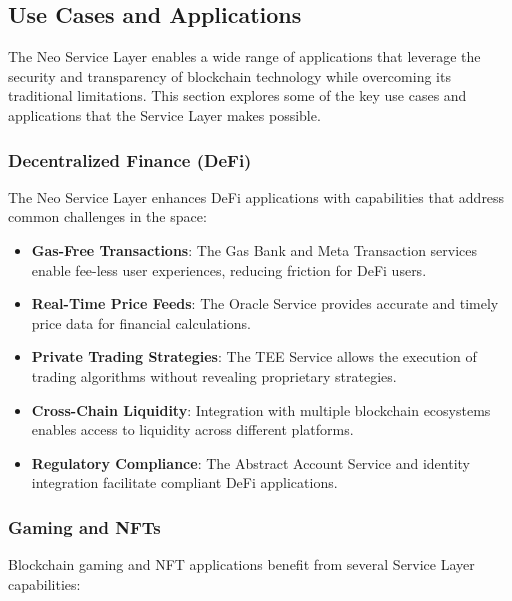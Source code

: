 \subsection{Use Cases and Applications}
\label{subsec:nsl-use-cases}

The Neo Service Layer enables a wide range of applications that leverage the security and transparency of blockchain technology while overcoming its traditional limitations. This section explores some of the key use cases and applications that the Service Layer makes possible.

\subsubsection{Decentralized Finance (DeFi)}
\label{subsubsec:defi}

The Neo Service Layer enhances DeFi applications with capabilities that address common challenges in the space:

\begin{itemize}
    \item \textbf{Gas-Free Transactions}: The Gas Bank and Meta Transaction services enable fee-less user experiences, reducing friction for DeFi users.
    
    \item \textbf{Real-Time Price Feeds}: The Oracle Service provides accurate and timely price data for financial calculations.
    
    \item \textbf{Private Trading Strategies}: The TEE Service allows the execution of trading algorithms without revealing proprietary strategies.
    
    \item \textbf{Cross-Chain Liquidity}: Integration with multiple blockchain ecosystems enables access to liquidity across different platforms.
    
    \item \textbf{Regulatory Compliance}: The Abstract Account Service and identity integration facilitate compliant DeFi applications.
\end{itemize}

\subsubsection{Gaming and NFTs}
\label{subsubsec:gaming-nfts}

Blockchain gaming and NFT applications benefit from several Service Layer capabilities:

